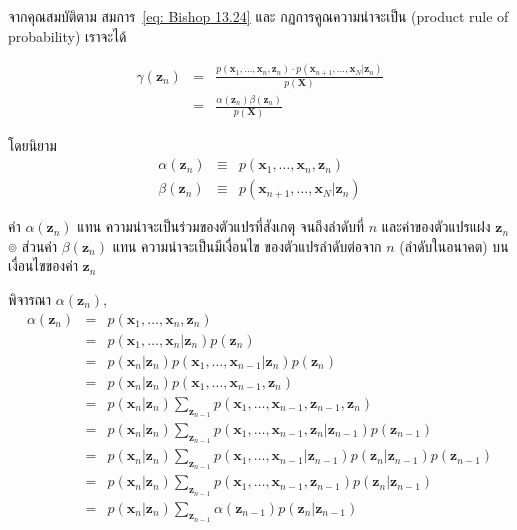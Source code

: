 จากคุณสมบัติตาม สมการ~\ref{eq: Bishop 13.24} และ กฏการคูณความน่าจะเป็น (product rule of probability) เราจะได้

\begin{eqnarray}
\gamma (\textbf{z}_n) 
&=& \frac{p(\textbf{x}_1, \ldots, \textbf{x}_n, \textbf{z}_n) \cdot p(\textbf{x}_{n+1}, \ldots, \textbf{x}_N|\textbf{z}_n)}{p(\textbf{X})}
\nonumber \\
&=& \frac{\alpha(\textbf{z}_n) \beta(\textbf{z}_n)}{p(\textbf{X})}
\label{eq: Bishop 13.33}
\end{eqnarray}

โดยนิยาม
\begin{eqnarray}
\alpha(\textbf{z}_n) 
& \equiv & p(\textbf{x}_1, \ldots, \textbf{x}_n, \textbf{z}_n)
\label{eq: Bishop 13.34} \\
\beta(\textbf{z}_n)
& \equiv & p(\textbf{x}_{n+1}, \ldots, \textbf{x}_N | \textbf{z}_n)
\label{eq: Bishop 13.35}
\end{eqnarray}

ค่า $\alpha(\textbf{z}_n)$ แทน ความน่าจะเป็นร่วมของตัวแปรที่สังเกตุ จนถึงลำดับที่ $n$ และค่าของตัวแปรแฝง $\textbf{z}_n$
๏ ส่วนค่า $\beta(\textbf{z}_n)$ แทน ความน่าจะเป็นมีเงื่อนไข ของตัวแปรลำดับต่อจาก $n$ (ลำดับในอนาคต) บนเงื่อนไขของค่า $\textbf{z}_n$

พิจารณา $\alpha(\textbf{z}_n)$,
\begin{eqnarray}
\alpha(\textbf{z}_n) 
&=& p(\textbf{x}_1, \ldots, \textbf{x}_n, \textbf{z}_n)
\nonumber \\
&=& p(\textbf{x}_1, \ldots, \textbf{x}_n| \textbf{z}_n) p(\textbf{z}_n)
\nonumber \\
&=& p(\textbf{x}_n|\textbf{z}_n) p(\textbf{x}_1, \ldots, \textbf{x}_{n-1}|\textbf{z}_n) p(\textbf{z}_n)
\nonumber \\
&=& p(\textbf{x}_n|\textbf{z}_n) p (\textbf{x}_1, \ldots, \textbf{x}_{n-1}, \textbf{z}_n)
\nonumber \\
&=& p(\textbf{x}_n|\textbf{z}_n) \sum_{\textbf{z}_{n-1}} p (\textbf{x}_1, \ldots, \textbf{x}_{n-1}, \textbf{z}_{n-1}, \textbf{z}_n)
\nonumber \\
&=& p(\textbf{x}_n|\textbf{z}_n) \sum_{\textbf{z}_{n-1}} p (\textbf{x}_1, \ldots, \textbf{x}_{n-1}, \textbf{z}_n| \textbf{z}_{n-1}) p(\textbf{z}_{n-1})
\nonumber \\
&=& p(\textbf{x}_n|\textbf{z}_n) \sum_{\textbf{z}_{n-1}} p (\textbf{x}_1, \ldots, \textbf{x}_{n-1}| \textbf{z}_{n-1}) p(\textbf{z}_n|\textbf{z}_{n-1}) p(\textbf{z}_{n-1})
\nonumber \\
&=& p(\textbf{x}_n|\textbf{z}_n) \sum_{\textbf{z}_{n-1}} p (\textbf{x}_1, \ldots, \textbf{x}_{n-1},\textbf{z}_{n-1}) p(\textbf{z}_n|\textbf{z}_{n-1})
\nonumber \\
&=& p(\textbf{x}_n|\textbf{z}_n) \sum_{\textbf{z}_{n-1}} \alpha(\textbf{z}_{n-1}) p(\textbf{z}_n|\textbf{z}_{n-1})
\label{eq: Bishop 13.36}
\end{eqnarray}

